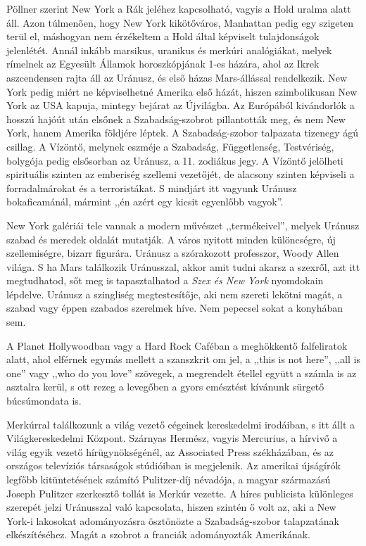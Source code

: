 Pöllner
szerint New York a Rák jeléhez kapcsolható, vagyis a
Hold uralma alatt áll. Azon túlmenően, hogy New York kikötőváros,
Manhattan pedig egy szigeten terül el, máshogyan nem érzékeltem
a Hold által képviselt tulajdonságok jelenlétét. Annál inkább
marsikus, uranikus és merkúri analógiákat, melyek rímelnek az
Egyesült Államok horoszkópjának 1-es házára, ahol az Ikrek aszcendensen
rajta áll az Uránusz, és első házas Mars-állással rendelkezik.
New York pedig miért ne képviselhetné Amerika első házát,
hiszen szimbolikusan New York az USA kapuja, mintegy bejárat az
Újvilágba. Az Európából kivándorlók a hosszú hajóút után elsőnek
a Szabadság-szobrot pillantották meg, és nem New York, hanem
Amerika földjére léptek. A Szabadság-szobor talpazata tizenegy
ágú csillag. A Vízöntő, melynek eszméje a Szabadság, Függetlenség,
Testvériség, bolygója pedig elsősorban az Uránusz, a 11. zodiákus
jegy. A Vízöntő jelölheti spirituális szinten az emberiség szellemi
vezetőjét, de alacsony szinten képviseli a forradalmárokat és a terroristákat.
S mindjárt itt vagyunk Uránusz bokaficamánál, mármint
,,én azért egy kicsit egyenlőbb vagyok''.

New York galériái tele vannak a modern művészet ,,termékeivel'',
melyek Uránusz szabad és meredek oldalát mutatják. A város nyitott
minden különcségre, új szellemiségre, bizarr figurára. Uránusz a szórakozott
professzor, Woody Allen világa. S ha Mars találkozik Uránusszal,
akkor amit tudni akarsz a szexről, azt itt megtudhatod, sőt meg
is tapasztalhatod a \textit{Szex és New York} nyomdokain lépdelve. Uránusz a
szingliség megtestesítője, aki nem szereti lekötni magát, a szabad vagy
éppen szabados szerelmek híve. Nem pepecsel sokat a konyhában sem.

A Planet Hollywoodban vagy a Hard Rock Caféban a meghökkentő
falfeliratok alatt, ahol elférnek egymás mellett a szanszkrit om jel,
a ,,this is not here'', ,,all is one'' vagy ,,who do you love'' szövegek,
a megrendelt étellel együtt a számla is az asztalra kerül, s ott rezeg a
levegőben a gyors emésztést kívánunk sürgető búcsúmondata is.

Merkúrral találkozunk a világ vezető cégeinek kereskedelmi irodáiban,
s itt állt a Világkereskedelmi Központ. Szárnyas Hermész,
vagyis Mercurius, a hírvivő a világ egyik vezető hírügynökségénél,
az Associated Press székházában, és az országos televíziós társaságok
stúdióiban is megjelenik. Az amerikai újságírók legfőbb kitüntetésének
számító Pulitzer-díj névadója, a magyar származású Joseph
Pulitzer szerkesztő tollát is Merkúr vezette. A híres publicista különleges
szerepét jelzi Uránusszal való kapcsolata, hiszen szintén ő volt
az, aki a New York-i lakosokat adományozásra ösztönözte a Szabadság-szobor
talapzatának elkészítéséhez. Magát a szobrot a franciák
adományozták Amerikának.

